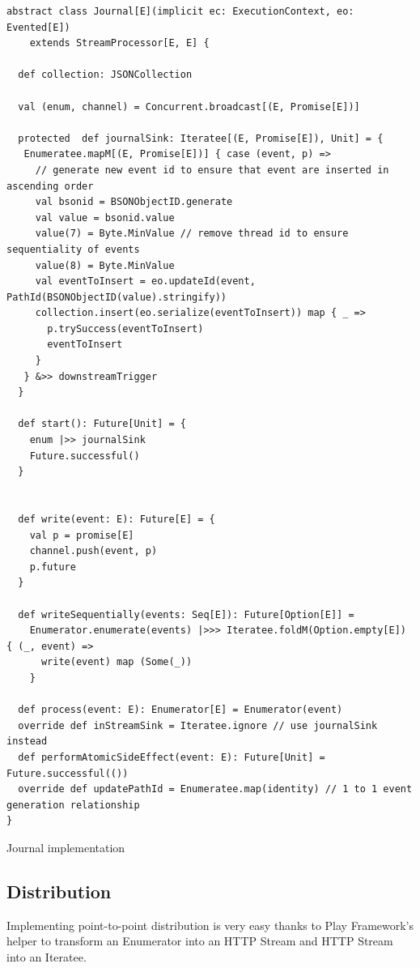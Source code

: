 \begin{listing}[h]
\begin{verbatim}
abstract class Journal[E](implicit ec: ExecutionContext, eo: Evented[E]) 
    extends StreamProcessor[E, E] {

  def collection: JSONCollection

  val (enum, channel) = Concurrent.broadcast[(E, Promise[E])]
  
  protected  def journalSink: Iteratee[(E, Promise[E]), Unit] = {
   Enumeratee.mapM[(E, Promise[E])] { case (event, p) =>
     // generate new event id to ensure that event are inserted in ascending order
     val bsonid = BSONObjectID.generate 
     val value = bsonid.value
     value(7) = Byte.MinValue // remove thread id to ensure sequentiality of events
     value(8) = Byte.MinValue
     val eventToInsert = eo.updateId(event, PathId(BSONObjectID(value).stringify))
     collection.insert(eo.serialize(eventToInsert)) map { _ =>
       p.trySuccess(eventToInsert)
       eventToInsert
     }
   } &>> downstreamTrigger
  }

  def start(): Future[Unit] = {
    enum |>> journalSink
    Future.successful()
  }


  def write(event: E): Future[E] = {
    val p = promise[E]
    channel.push(event, p)
    p.future
  }

  def writeSequentially(events: Seq[E]): Future[Option[E]] =
    Enumerator.enumerate(events) |>>> Iteratee.foldM(Option.empty[E]) { (_, event) =>
      write(event) map (Some(_))
    }

  def process(event: E): Enumerator[E] = Enumerator(event)
  override def inStreamSink = Iteratee.ignore // use journalSink instead
  def performAtomicSideEffect(event: E): Future[Unit] = Future.successful(())
  override def updatePathId = Enumeratee.map(identity) // 1 to 1 event generation relationship
}
\end{verbatim}
\caption{Journal implementation}
\label{lst:journalimpl}
\end{listing}


\subsection{Distribution}

Implementing point-to-point distribution is very easy thanks to Play Framework's helper to transform an Enumerator into an HTTP Stream and HTTP Stream into an Iteratee.


